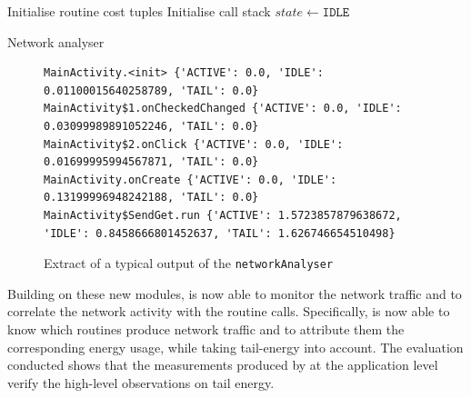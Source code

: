 \begin{algorithm}[h]
Initialise routine cost tuples\;
Initialise call stack\;
$state \leftarrow \texttt{IDLE}$\;
\caption{Network analyser}
\label{alg:netanal}
\end{algorithm}

\begin{figure}
\begin{lstlisting}
MainActivity.<init> {'ACTIVE': 0.0, 'IDLE': 0.01100015640258789, 'TAIL': 0.0}
MainActivity$1.onCheckedChanged {'ACTIVE': 0.0, 'IDLE': 0.03099989891052246, 'TAIL': 0.0}
MainActivity$2.onClick {'ACTIVE': 0.0, 'IDLE': 0.01699995994567871, 'TAIL': 0.0}
MainActivity.onCreate {'ACTIVE': 0.0, 'IDLE': 0.13199996948242188, 'TAIL': 0.0}
MainActivity$SendGet.run {'ACTIVE': 1.5723857879638672, 'IDLE': 0.8458666801452637, 'TAIL': 1.626746654510498}
\end{lstlisting}
\caption{Extract of a typical output of the \texttt{networkAnalyser}}
\label{fig:tailfeedback}
\vspace {-0.32in}
\end{figure}

Building on these new modules, \Orka{} is now able to monitor the 
network traffic and to correlate the network activity with the routine 
calls. Specifically, \Orka{} is now able to know which routines produce 
network traffic and to attribute them the corresponding energy usage, 
while taking tail-energy into account. The evaluation conducted shows 
that the measurements produced by \Orka{} at the application level 
verify the high-level observations on tail energy.
